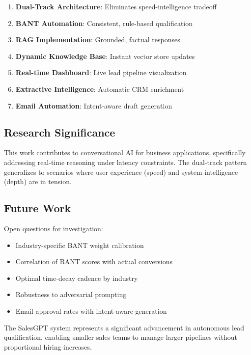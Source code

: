 \documentclass[10pt,twocolumn,a4paper]{article}
\begin{document}
\begin{enumerate}
    \item \textbf{Dual-Track Architecture}: Eliminates speed-intelligence tradeoff
    \item \textbf{BANT Automation}: Consistent, rule-based qualification
    \item \textbf{RAG Implementation}: Grounded, factual responses
    \item \textbf{Dynamic Knowledge Base}: Instant vector store updates
    \item \textbf{Real-time Dashboard}: Live lead pipeline visualization
    \item \textbf{Extractive Intelligence}: Automatic CRM enrichment
    \item \textbf{Email Automation}: Intent-aware draft generation
\end{enumerate}

\subsection{Research Significance}

This work contributes to conversational AI for business applications, specifically addressing real-time reasoning under latency constraints. The dual-track pattern generalizes to scenarios where user experience (speed) and system intelligence (depth) are in tension.

\subsection{Future Work}

Open questions for investigation:

\begin{itemize}
    \item Industry-specific BANT weight calibration
    \item Correlation of BANT scores with actual conversions
    \item Optimal time-decay cadence by industry
    \item Robustness to adversarial prompting
    \item Email approval rates with intent-aware generation
\end{itemize}

The SalesGPT system represents a significant advancement in autonomous lead qualification, enabling smaller sales teams to manage larger pipelines without proportional hiring increases.
\end{document}
